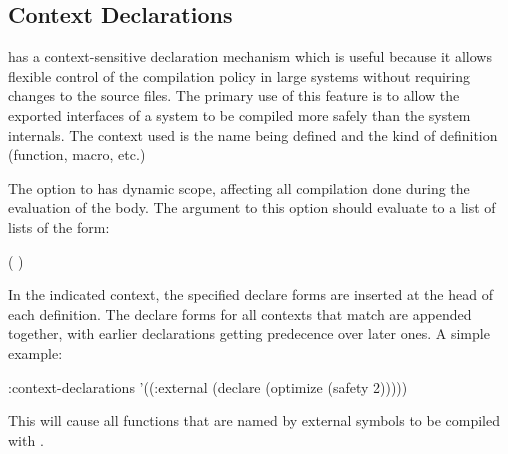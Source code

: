 \subsection{Context Declarations}
\label{context-declarations}

\cmucl{} has a context-sensitive declaration mechanism which is useful because it
allows flexible control of the compilation policy in large systems without
requiring changes to the source files.  The primary use of this feature is to
allow the exported interfaces of a system to be compiled more safely than the
system internals.  The context used is the name being defined and the kind of
definition (function, macro, etc.) 

The  option to  has
dynamic scope, affecting all compilation done during the evaluation of the
body.  The argument to this option should evaluate to a list of lists of the
form:
\begin{example}
( )
\end{example}
In the indicated context, the specified declare forms are inserted at
the head of each definition.  The declare forms for all contexts that
match are appended together, with earlier declarations getting
predecence over later ones.  A simple example:
\begin{example}
    :context-declarations
    '((:external (declare (optimize (safety 2)))))
\end{example}
This will cause all functions that are named by external symbols to be
compiled with .

